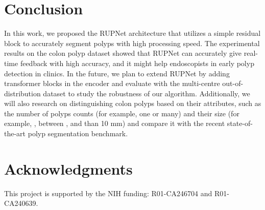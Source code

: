 \documentclass{article}
\begin{document}
\section{Conclusion}
In this work, we proposed the RUPNet architecture that utilizes a simple residual block to accurately segment polyps with high processing speed. The experimental results on the colon polyp dataset showed that RUPNet can accurately give real-time feedback with high accuracy, and it might help endoscopists in early polyp detection in clinics. In the future, we plan to extend RUPNet by adding transformer blocks in the encoder and evaluate with the multi-centre out-of-distribution dataset to study the robustness of our algorithm. Additionally, we will also research on distinguishing colon polyps based on their attributes, such as the number of polyps counts (for example, one or many) and their size (for example, , between , and  than 10 mm) and compare it with the recent state-of-the-art polyp segmentation benchmark. 

\section*{Acknowledgments}
This project is supported by the NIH funding: R01-CA246704 and R01-CA240639.

  
  
\end{document}
